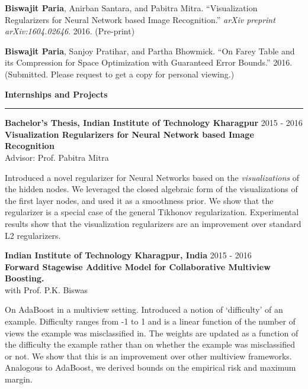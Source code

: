 \documentclass[10pt]{article}
\newcommand{\heading}[1]{
 {\large \textbf{#1}}
  \vspace{0.4em}
  \hrule
  \vspace{0.4em}
}
\newcommand{\EntryGap}{\vspace{0.4	cm}}
\newcommand{\SmallEntryGap}{\vspace{0.2cm}}
\newcommand{\indentedpar}[1]{
  \hangindent=1cm \hangafter=0 #1
}
\begin{document}
  \SmallEntryGap
  \textbf{Biswajit Paria}, Anirban Santara, and Pabitra Mitra.
  ``Visualization Regularizers for Neural Network based Image Recognition.''
  \emph{arXiv preprint arXiv:1604.02646}. 2016. (Pre-print)
  
  \SmallEntryGap
  \textbf{Biswajit Paria}, Sanjoy Pratihar, and Partha Bhowmick.
  ``On Farey Table and its Compression for Space Optimization with Guaranteed Error Bounds.''
  2016. (Submitted. Please request to get a copy for personal viewing.)


\EntryGap

\heading{Internships and Projects}

\textbf{Bachelor's Thesis, Indian Institute of Technology Kharagpur} \hfill 2015 - 2016\\
\textbf{Visualization Regularizers for Neural Network based Image Recognition}\\
Advisor: Prof. Pabitra Mitra

\SmallEntryGap

\indentedpar{
    Introduced a novel regularizer for Neural Networks
    based on the \emph{visualizations} of the hidden nodes. 
    We leveraged the closed algebraic form of the
    visualizations of the first layer nodes, and used it as a smoothness prior.
    We show that the regularizer is a special case of the 
    general Tikhonov regularization. Experimental results show that the 
    visualization regularizers are an improvement over standard L2 regularizers.
}

\SmallEntryGap

\textbf{Indian Institute of Technology Kharagpur, India} \hfill 2015 - 2016\\
\textbf{Forward Stagewise Additive Model for Collaborative Multiview Boosting.}\\
with Prof. P.K. Biswas

\SmallEntryGap

\indentedpar{
  On AdaBoost in a multiview setting.
  Introduced a notion of ‘difficulty’ of an example. Difficulty ranges 
  from -1 to 1 and is a linear function of the number of views the example
  was misclassified in. The weights are updated as a function of the 
  difficulty the example rather than on whether the example was misclassified
  or not. We show that this is an improvement over other multiview frameworks. Analogous
  to AdaBoost, we derived bounds on 
  the empirical risk and maximum margin.
}
\end{document}

